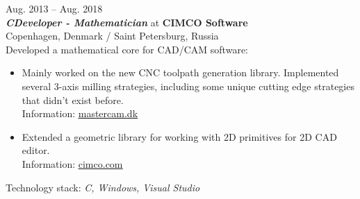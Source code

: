 \documentclass[a4paper,10pt]{article}
\def\CC{{C\nolinebreak[4]\hspace{-.05em}\raisebox{.4ex}{\tiny\bf ++}}}
\begin{document}
\begin{adjustbox}{valign=t}
\begin{minipage}{0.61\textwidth}
\textcolor{ColorOne}{Aug. 2013 -- Aug. 2018}\\
\emph{\textbf{\CC Developer - Mathematician}} at \textbf{CIMCO Software}\\
Copenhagen, Denmark / Saint Petersburg, Russia\\
\vspace{10 pt}
Developed a mathematical core for CAD/CAM software:
\begin{itemize}[noitemsep]
	\item Mainly worked on the new CNC toolpath generation library. Implemented several 3-axis milling 
		strategies, including some unique cutting edge strategies that didn't exist before. \\
		Information: 
		\href{https://www.mastercam.dk/hsm-performance-pack/product/machining-strategies}
		{\underline{mastercam.dk}}
	\item Extended a geometric library for working with 2D primitives for 2D CAD editor.\\
		Information: 
		\href{https://www.cimco.com/software/cimco-cnc-calc}
		{\underline{cimco.com}}
\end{itemize}
Technology stack: 
\emph{\CC, Windows, Visual Studio}\\


\end{minipage}
\end{adjustbox}
\end{document}
